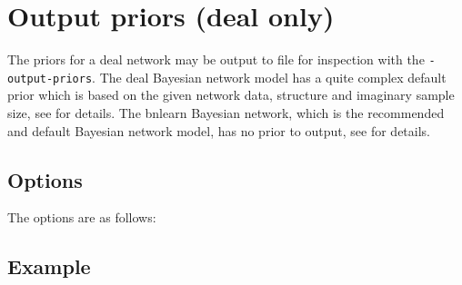 \documentclass[a4paper,12pt]{article}
\newcommand{\code}[1]{{\footnotesize{{\tt #1}}}}
\begin{document}



\section{Output priors (deal only)}
\label{output-priors}

The priors for a deal network may be output to file for inspection with the \code{-output-priors}. The deal Bayesian network model has a quite complex default prior which is based on the given network data, structure and imaginary sample size, see \citet{deal} for details. The bnlearn Bayesian network, which is the recommended and default Bayesian network model, has no prior to output, see \citet{bnlearn} for details. 
\subsection{Options}
\label{output-priors-options}

The options are as follows: 

{\begin{center}\end{center}}


\subsection{Example}
\label{output-priors-example}
\end{document}
